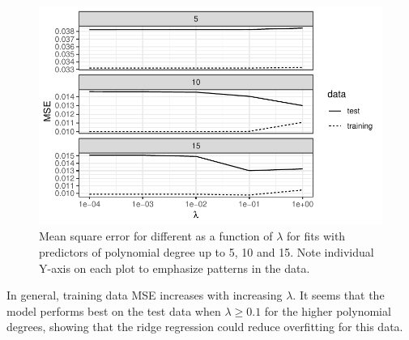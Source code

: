 \documentclass[
  letterpaper,
  DIV=11,
  numbers=noendperiod]{scrartcl}
\begin{document}
\begin{figure}[H]

{\centering \includegraphics{w36-exercises_files/figure-pdf/unnamed-chunk-10-3.pdf}

}

\caption{Mean square error for different as a function of \(\lambda\)
for fits with predictors of polynomial degree up to 5, 10 and 15. Note
individual Y-axis on each plot to emphasize patterns in the data.}

\end{figure}

In general, training data MSE increases with increasing \(\lambda\). It
seems that the model performs best on the test data when
\(\lambda \ge 0.1\) for the higher polynomial degrees, showing that the
ridge regression could reduce overfitting for this data.
\end{document}
